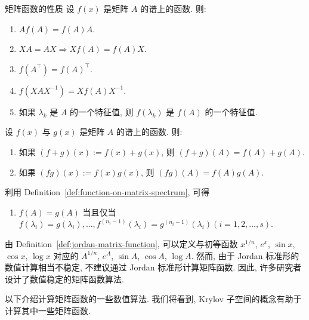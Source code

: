 \begin{Theorem}{{矩阵函数的性质}}\label{thm:matrix-function-properties}
{设 $f(x)$ 是矩阵 $A$ 的谱上的函数. 则:}
\begin{enumerate}[label=(\arabic*)]
\item $Af(A)=f(A)A$.
\item $XA=AX\Rightarrow Xf(A)=f(A)X$.
\item $f(A^{\top})=f(A)^{\top}$.
\item $f(XAX^{-1})=Xf(A)X^{-1}$.
\item {如果 $\lambda_k$ 是 $A$ 的一个特征值, 则 $f(\lambda_k)$ 是 $f(A)$ 的一个特征值.}
\end{enumerate}
{设 $f(x)$ 与 $g(x)$ 是矩阵 $A$ 的谱上的函数. 则:}
\begin{enumerate}[label=(\arabic*),start=6]
\item {如果 $(f+g)(x):=f(x)+g(x)$, 则 $(f+g)(A)=f(A)+g(A)$.}
\item {如果 $(fg)(x):=f(x)g(x)$, 则 $(fg)(A)=f(A)g(A)$.}
\end{enumerate}
{利用 Definition~\ref{def:function-on-matrix-spectrum}, 可得}
\begin{enumerate}[label=(\arabic*),start=8]
\item {$f(A)=g(A)$ 当且仅当\newline{}$f(\lambda_i)=g(\lambda_i),\ldots,f^{(n_i-1)}(\lambda_i)=g^{(n_i-1)}(\lambda_i)$\newline{}$(i=1,2,\ldots,s)$.}
\end{enumerate}
\end{Theorem}

{\leavevmode{}\label{srcpage:printed-194}由 Definition~\ref{def:jordan-matrix-function}, 可以定义与初等函数 $x^{1/n}$, $e^x$, $\sin x$, $\cos x$, $\log x$ 对应的 $A^{1/n}$, $e^A$, $\sin A$, $\cos A$, $\log A$. 然而, 由于 Jordan 标准形的数值计算相当不稳定, 不建议通过 Jordan 标准形计算矩阵函数. 因此, 许多研究者设计了数值稳定的矩阵函数算法.}

{以下介绍计算矩阵函数的一些数值算法. 我们将看到, Krylov 子空间的概念有助于计算其中一些矩阵函数.}
